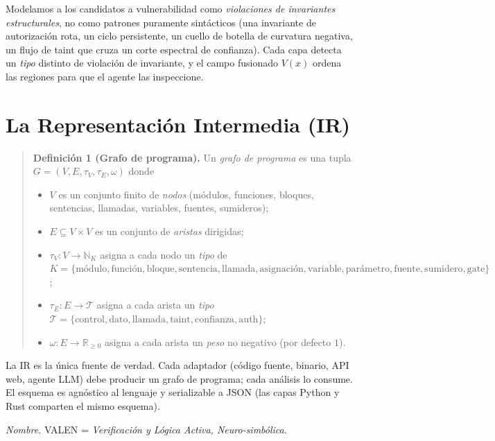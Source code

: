 \documentclass[11pt]{article}
\newcommand{\R}{\mathbb{R}}
\newcommand{\N}{\mathbb{N}}
\begin{document}
Modelamos a los candidatos a vulnerabilidad como \emph{violaciones de invariantes
estructurales}, no como patrones puramente sintácticos (una invariante de
autorización rota, un ciclo persistente, un cuello de botella de curvatura
negativa, un flujo de taint que cruza un corte espectral de confianza). Cada capa detecta un \emph{tipo} distinto
de violación de invariante, y el campo fusionado $V(x)$ ordena las regiones para
que el agente las inspeccione.

\section{La Representación Intermedia (IR)}
\begin{quote}
\textbf{Definición 1 (Grafo de programa).} Un \emph{grafo de programa} es una
tupla $G = (V, E, \tau_V, \tau_E, \omega)$ donde
\begin{itemize}[leftmargin=1.5em]
  \item $V$ es un conjunto finito de \emph{nodos} (módulos, funciones, bloques,
        sentencias, llamadas, variables, fuentes, sumideros);
  \item $E \subseteq V \times V$ es un conjunto de \emph{aristas} dirigidas;
  \item $\tau_V : V \to \N_K$ asigna a cada nodo un \emph{tipo} de
        $K = \{\text{módulo}, \allowbreak \text{función}, \allowbreak
        \text{bloque}, \allowbreak \text{sentencia}, \allowbreak \text{llamada},
        \allowbreak \text{asignación}, \allowbreak \text{variable}, \allowbreak
        \text{parámetro}, \allowbreak \text{fuente}, \allowbreak \text{sumidero},
        \allowbreak \text{gate}\}$;
  \item $\tau_E : E \to \mathcal{T}$ asigna a cada arista un \emph{tipo}
        $\mathcal{T} = \{\text{control}, \allowbreak \text{dato}, \allowbreak
        \text{llamada}, \allowbreak \text{taint}, \allowbreak \text{confianza},
        \allowbreak \text{auth}\}$;
  \item $\omega : E \to \R_{\ge 0}$ asigna a cada arista un \emph{peso} no
        negativo (por defecto $1$).
\end{itemize}
\end{quote}
La IR es la única fuente de verdad. Cada adaptador (código fuente, binario, API
web, agente LLM) debe producir un grafo de programa; cada análisis lo consume.
El esquema es agnóstico al lenguaje y serializable a JSON (las capas Python y
Rust comparten el mismo esquema).

\emph{Nombre.} VALEN = \emph{Verificación y Lógica Activa, Neuro-simbólica}.
\end{document}
